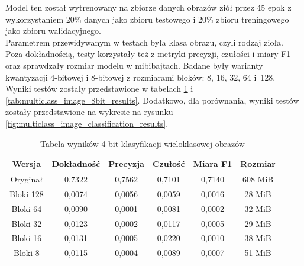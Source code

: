 Model ten został wytrenowany na zbiorze danych obrazów ziół przez 45 epok z wykorzystaniem 20\% danych jako zbioru testowego i 20\% zbioru treningowego jako zbioru walidacyjnego. \\
Parametrem przewidywanym w testach była klasa obrazu, czyli rodzaj zioła. \\
Poza dokładnością, testy korzystały też z metryki precyzji, czułości i miary F1 oraz sprawdzały rozmiar modelu w mibibajtach. Badane były warianty kwantyzacji 4-bitowej i 8-bitowej z rozmiarami bloków: 8, 16, 32, 64 i~128. \\
Wyniki testów zostały przedstawione w tabelach \ref{tab:multiclass_image_4bit_results} i \ref{tab:multiclass_image_8bit_results}. Dodatkowo, dla porównania, wyniki testów zostały przedstawione na wykresie na rysunku \ref{fig:multiclass_image_classification_results}.
\begin{table}
    \centering
    \caption{Tabela wyników 4-bit klasyfikacji wieloklasowej obrazów}
    \label{tab:multiclass_image_4bit_results}
    \begin{tabular}{|c|c|c|c|c|c|}
        \hline
        \textbf{Wersja} & \textbf{Dokładność} & \textbf{Precyzja} & \textbf{Czułość} & \textbf{Miara F1} & \textbf{Rozmiar} \\
        \hline
        Oryginał & 0,7322 & 0,7562 & 0,7101 & 0,7140 & 608 MiB \\
        \hline
        Bloki 128 & 0,0074 & 0,0056 & 0,0059 & 0,0016 & 28 MiB \\
        \hline
        Bloki 64 & 0,0090 & 0,0001 & 0,0081 & 0,0002 & 32 MiB \\
        \hline
        Bloki 32 & 0,0123 & 0,0002 & 0,0117 & 0,0005 & 29 MiB \\
        \hline
        Bloki 16 & 0,0131 & 0,0005 & 0,0220 & 0,0010 & 38 MiB \\
        \hline
        Bloki 8 & 0,0115 & 0,0004 & 0,0089 & 0,0007 & 51 MiB \\
        \hline
    \end{tabular}
\end{table}
